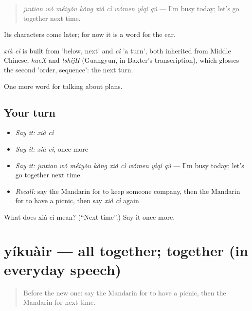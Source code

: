 \begin{quote}
\emph{jīntiān wǒ méiyǒu kòng xià cì wǒmen yìqǐ qù} — I'm busy today; let's go together next time.
\end{quote}

Its characters come later; for now it is a word for the ear.

\begin{cousinweb}
\emph{xià cì} is built from  'below, next' and \emph{cì} 'a turn', both inherited from Middle Chinese, \emph{haeX} and \emph{tshijH} (Guangyun, in Baxter's transcription), which glosses the second 'order, sequence': the next turn.
\end{cousinweb}

\begin{grammarlens}[title={What you've built}]
One more word for talking about plans.
\end{grammarlens}

\subsection*{Your turn}
\begin{itemize}
\raggedright
  \item \emph{Say it:} \emph{xià cì}
  \item \emph{Say it:} \emph{xià cì}, once more
  \item \emph{Say it:} \emph{jīntiān wǒ méiyǒu kòng xià cì wǒmen yìqǐ qù} — I'm busy today; let's go together next time.
  \item \emph{Recall:} say the Mandarin for to keep someone company, then the Mandarin for to have a picnic, then say \emph{xià cì} again
\end{itemize}

\begin{tcolorbox}[breakable,colback=teal!4,colframe=teal!35!black,title={Before you move on}]
What does xià cì mean? (\textquotedblleft{}Next time\textquotedblright{}.) Say it once more.
\end{tcolorbox}
\section[yíkuàir]{yíkuàir — all together; together (in everyday speech)}

\label{lesson:ZH-C163-yikuair}



\begin{quote}
Before the new one: say the Mandarin for to have a picnic, then the Mandarin for next time.
\end{quote}

